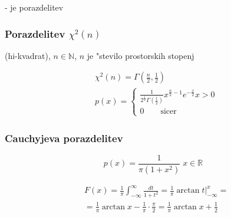 \documentclass[a4paper,12pt]{article}
\theoremstyle{definition}
\theoremstyle{remark}
\newcommand{\N}{\mathbb{N}}
\newcommand{\R}{\mathbb{R}}
\begin{document}
- je porazdelitev

\subsubsection{Porazdelitev $\chi^2(n)$}

(hi-kvadrat), $n \in \N$, $n$ je "stevilo prostorskih stopenj

\begin{align*}
    &\chi^2(n) = \Gamma(\frac{n}{2}, \frac{1}{2}) \\
    &p(x) = \begin{cases}
        \frac{1}{2^{\frac{1}{2}} \Gamma(\frac{1}{2})} x^{\frac{n}{2} - 1} e^{-\frac{x}{2}} x > 0 \\
        0 \qquad \text{sicer}
    \end{cases}
\end{align*}

\subsubsection{Cauchyjeva porazdelitev}

\begin{equation*}
    p(x) = \frac{1}{\pi (1+x^2)} \; x \in \R
\end{equation*}

\begin{align*}
    &F(x) = \frac{1}{\pi} \int_{-\infty}^{\infty} \frac{dt}{1+t^2} = \frac{1}{\pi} \arctan t \vert_{-\infty}^x = \\
    &= \frac{1}{\pi} \arctan x - \frac{1}{\pi} \cdot \frac{\pi}{2} = \frac{1}{\pi} \arctan x + \frac{1}{2}
\end{align*}
\end{document}
